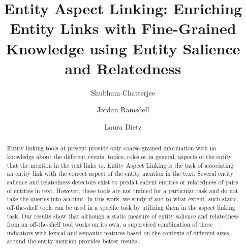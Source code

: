 \documentclass[sigconf,authordraft]{acmart}
\begin{document}
%
\title[Entity Aspect Linking]{Entity Aspect Linking: Enriching Entity Links with Fine-Grained Knowledge using Entity Salience and Relatedness}

%
\author{Shubham Chatterjee}
\author{Jordan Ramsdell}
\author{Laura Dietz}

%
\renewcommand{\shortauthors}{Chatterjee et al.}

%
\begin{abstract}
Entity linking tools at present provide only coarse-grained information with no knowledge about the different events, topics, roles or in general, aspects of the entity that the mention in the text links to. Entity Aspect Linking is the task of associating an entity link with the correct aspect of the entity mention in the text. Several entity salience and relatedness detectors exist to predict salient entities or relatedness of pairs of entities in text. However, these tools are not trained for a particular task and do not take the queries into account. In this work, we study if and to what extent, such static, off-the-shelf tools can be used in a specific task by utilizing them in the aspect linking task. Our results show that although a static measure of entity salience and relatedness from an off-the-shelf tool works on its own, a supervised combination of these indicators with lexical and semantic features based on the contexts of different sizes around the entity mention provides better results.


\end{abstract}
\end{document}
